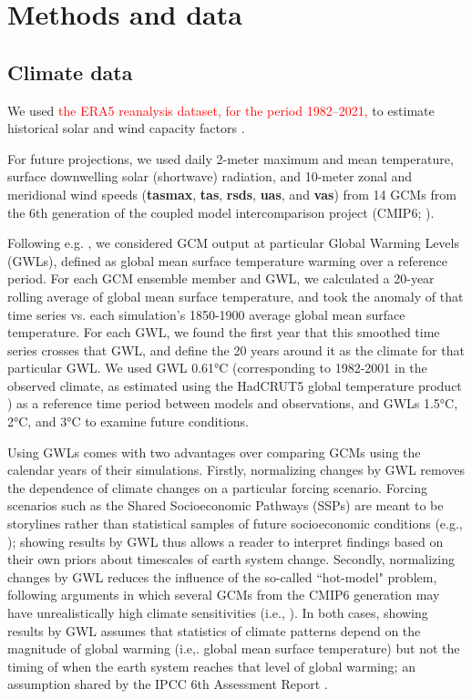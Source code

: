 \documentclass[pdflatex,sn-mathphys-num]{sn-jnl}%
\begin{document}
\clearpage

\section{Methods and data}\label{sec:methods}

\subsection{Climate data}\label{sec:climate_data}


We used \textcolor{red}{the ERA5 reanalysis dataset, for the period 1982--2021,} to estimate historical solar and wind capacity factors \textcolor{red}{\cite{cds_era5_daily_2024}}.

For future projections, we used daily 2-meter maximum and mean temperature, surface downwelling solar (shortwave) radiation, and 10-meter zonal and meridional wind speeds (\textbf{tasmax}, \textbf{tas}, \textbf{rsds}, \textbf{uas}, and \textbf{vas}) from 14 GCMs from the 6th generation of the coupled model intercomparison project (CMIP6; \cite{eyring2016overview}). 

Following e.g. \cite{seneviratneRegionalClimateSensitivity2020, batibenizCountriesMostExposed2023}, we considered GCM output at particular Global Warming Levels (GWLs), defined as global mean surface temperature warming over a reference period. For each GCM ensemble member and GWL, we calculated a 20-year rolling average of  global mean surface temperature, and took the anomaly of that time series vs. each simulation's 1850-1900 average  global mean surface temperature. For each GWL, we found the first year that this smoothed time series crosses that GWL, and define the 20 years around it as the climate for that particular GWL. We used GWL 0.61°C (corresponding to 1982-2001 in the observed climate, as estimated using the HadCRUT5 global temperature product \cite{moriceUpdatedAssessmentNearSurface2021}) as a reference time period between models and observations, and GWLs 1.5°C, 2°C, and 3°C to examine future conditions. 

Using GWLs comes with two advantages over comparing GCMs using the calendar years of their simulations. Firstly, normalizing changes by GWL removes the dependence of climate changes on a particular forcing scenario. Forcing scenarios such as the Shared Socioeconomic Pathways (SSPs) are meant to be storylines rather than statistical samples of future socioeconomic conditions (e.g., \cite{riahiSharedSocioeconomicPathways2017a}); showing results by GWL thus allows a reader to interpret findings based on their own priors about timescales of earth system change. Secondly, normalizing changes by GWL reduces the influence of the so-called ``hot-model" problem, following arguments in which several GCMs from the CMIP6 generation may have unrealistically high climate sensitivities (i.e., \cite{hausfatherClimateSimulationsRecognize2022}). In both cases, showing results by GWL assumes that statistics of climate patterns depend on the magnitude of global warming (i.e,.  global mean surface temperature) but not the timing of when the earth system reaches that level of global warming; an assumption shared by the IPCC 6th Assessment Report \cite{IPCC2023SPM}.
\end{document}
